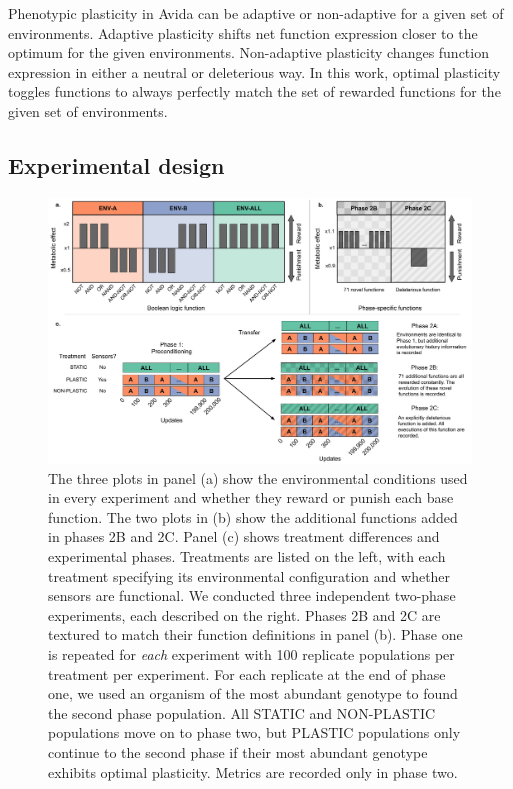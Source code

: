 \begin{raggedbottom}
Phenotypic plasticity in Avida can be adaptive or non-adaptive for a given set of environments.
Adaptive plasticity shifts net function expression closer to the optimum for the given environments.
Non-adaptive plasticity changes function expression in either a neutral or deleterious way.
In this work, optimal plasticity toggles functions to always perfectly match the set of rewarded functions for the given set of environments.

\subsection{Experimental design}
\label{sec:methods:experiment}

\begin{figure}[h!]
  \centering
  \includegraphics[width=1\textwidth]{02_consequences_of_plasticity/media/media-experimental-design.pdf}
  \caption{\small
  The three plots in panel (a) show the environmental conditions used in every experiment and whether they reward or punish each base function.
  The two plots in (b) show the additional functions added in phases 2B and 2C. %
  Panel (c) shows treatment differences and experimental phases.
  Treatments are listed on the left, with each treatment specifying its environmental configuration and whether sensors are functional.
  We conducted three independent two-phase experiments, each described on the right.
  Phases 2B and 2C are textured to match their function definitions in panel (b).
  Phase one is repeated for \textit{each} experiment with 100 replicate populations per treatment per experiment.
  For each replicate at the end of phase one, we used an organism of the most abundant genotype to found the second phase population.
  All STATIC and NON-PLASTIC populations move on to phase two, but PLASTIC populations only continue to the second phase if their most abundant genotype exhibits optimal plasticity.
  Metrics are recorded only in phase two.
  }
  \label{fig:experimental-design}
\end{figure}


\end{raggedbottom}
